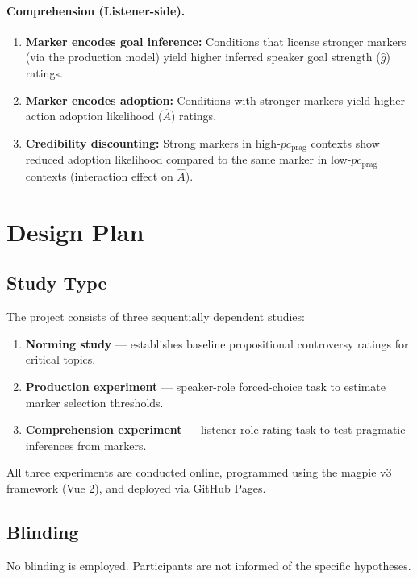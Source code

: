 \documentclass[12pt]{article}
\begin{document}
\paragraph{Comprehension (Listener-side).}
\begin{enumerate}[label=H\arabic*., start=4]
    \item \textbf{Marker encodes goal inference:} Conditions that license stronger markers (via the production model) yield higher inferred speaker goal strength ($\hat{g}$) ratings.
    \item \textbf{Marker encodes adoption:} Conditions with stronger markers yield higher action adoption likelihood ($\hat{A}$) ratings.
    \item \textbf{Credibility discounting:} Strong markers in high-$pc_{\text{prag}}$ contexts show reduced adoption likelihood compared to the same marker in low-$pc_{\text{prag}}$ contexts (interaction effect on $\hat{A}$).
\end{enumerate}


\section{Design Plan}

\subsection{Study Type}

The project consists of three sequentially dependent studies:
\begin{enumerate}
    \item \textbf{Norming study} --- establishes baseline propositional controversy ratings for critical topics.
    \item \textbf{Production experiment} --- speaker-role forced-choice task to estimate marker selection thresholds.
    \item \textbf{Comprehension experiment} --- listener-role rating task to test pragmatic inferences from markers.
\end{enumerate}

All three experiments are conducted online, programmed using the magpie v3 framework (Vue 2), and deployed via GitHub Pages.

\subsection{Blinding}
No blinding is employed. Participants are not informed of the specific hypotheses.
\end{document}
